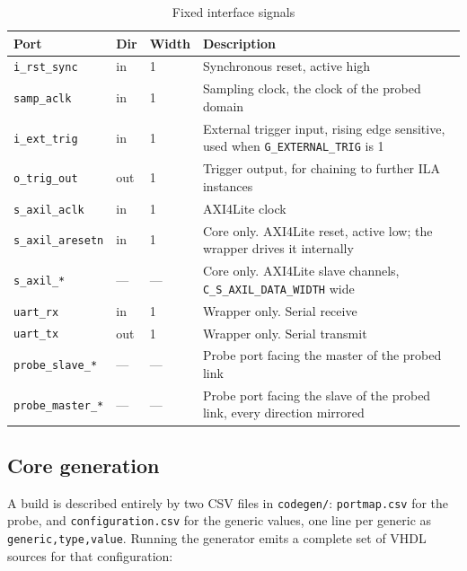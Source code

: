 \documentclass[twocolumn]{article}
\begin{document}
\begin{table}[h]
    \centering
    \begin{tabularx}{\textwidth}{|l|l|l|P|}
        \hline
         \textbf{Port} & \textbf{Dir} & \textbf{Width} & \textbf{Description} \\
        \hline
        \texttt{i\_rst\_sync}     & in  & 1 & Synchronous reset, active high \\
        \hline
        \texttt{samp\_aclk}      & in  & 1 & Sampling clock, the clock of the probed domain \\
        \hline
        \texttt{i\_ext\_trig}     & in  & 1 & External trigger input, rising edge sensitive, used when \texttt{G\_EXTERNAL\_TRIG} is 1 \\
        \hline
        \texttt{o\_trig\_out}     & out & 1 & Trigger output, for chaining to further \acs{ILA} instances \\
        \hline
        \texttt{s\_axil\_aclk}    & in  & 1 & AXI4Lite clock \\
        \hline
        \texttt{s\_axil\_aresetn} & in  & 1 & Core only. AXI4Lite reset, active low; the wrapper drives it internally \\
        \hline
        \texttt{s\_axil\_*}       & --- & --- & Core only. AXI4Lite slave channels, \texttt{C\_S\_AXIL\_DATA\_WIDTH} wide \\
        \hline
        \texttt{uart\_rx}        & in  & 1 & Wrapper only. Serial receive \\
        \hline
        \texttt{uart\_tx}        & out & 1 & Wrapper only. Serial transmit \\
        \hline
        \texttt{probe\_slave\_*}  & --- & --- & Probe port facing the master of the probed link \\
        \hline
        \texttt{probe\_master\_*} & --- & --- & Probe port facing the slave of the probed link, every direction mirrored \\
        \hline
    \end{tabularx}
    \caption{Fixed interface signals}
    \label{tab:ports}
\end{table}

\subsection{Core generation}
A build is described entirely by two CSV files in \texttt{codegen/}: \texttt{portmap.csv} for the probe, and \texttt{configuration.csv} for the generic values, one line per generic as \texttt{generic,type,value}. Running the generator emits a complete set of VHDL sources for that configuration:
\end{document}
